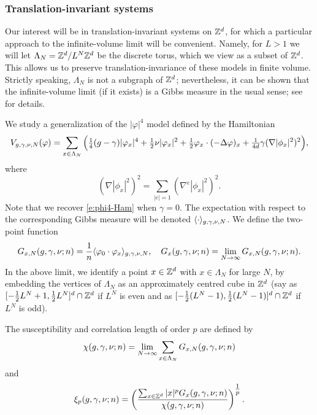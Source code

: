 \subsubsection{Translation-invariant systems}

Our interest will be in translation-invariant systems on ${ {{\mathbb Z}}^d }$, for which a particular approach to the infinite-volume limit will be convenient. Namely, for $L > 1$ we will let $\Lambda_N = { {{\mathbb Z}}^d }/L^N{ {{\mathbb Z}}^d }$ be the discrete torus, which we view as a subset of ${ {{\mathbb Z}}^d }$. This allows us to preserve
translation-invariance of these models in finite volume. Strictly speaking, $\Lambda_N$ is not a subgraph of ${ {{\mathbb Z}}^d }$; nevertheless, it can be shown that the infinite-volume limit (if it exists) is a Gibbs measure in the usual sense; see \cite[Example 4.20]{Georgii11} for details.


We study a generalization of the $|\varphi|^4$ model defined by the Hamiltonian
\begin{equation}
\label{e:Vdef1}
V_{g,\gamma,\nu,N}(\varphi)
	=
\sum_{x\in\Lambda_N}
\Big(
	\tfrac{1}{4} (g - \gamma) |\varphi_x|^4
		+
	\tfrac{1}{2} \nu |\varphi_x|^2
		+
	\tfrac{1}{2} \varphi_x \cdot (-\Delta \varphi)_x
		+
	\tfrac{1}{4 d} \gamma (\nabla |\phi_x|^2)^2
\Big),
\end{equation}
where
\begin{equation}
(\nabla |\phi_x|^2)^2
	=
\sum_{|e|=1} (\nabla^e |\phi_x|^2)^2.
\end{equation}
Note that we recover \eqref{e:phi4-Ham} when $\gamma = 0$.
The expectation with respect to the corresponding Gibbs measure will
be denoted $\langle\cdot\rangle_{g,\gamma,\nu,N}$.
We define the two-point function
\begin{equation}
\label{e:two-point-function-phi4}
G_{x, N}(g,\gamma,\nu; n)
	=
\frac{1}{n} \langle \varphi_0 \cdot \varphi_x \rangle_{g,\gamma,\nu,N},
	\quad
G_x(g,\gamma,\nu; n)
	=
\lim_{N \rightarrow \infty} G_{x, N}(g,\gamma,\nu; n).
\end{equation}
In the above limit, we identify a point $x \in { {{\mathbb Z}}^d }$ with $x \in \Lambda_N$
for large $N$, by embedding the vertices of $\Lambda_N$ as an approximately
centred cube in ${\mathbb Z}^d$ (say as $[-\frac12 L^N+1,\frac12 L^N]^d \cap {\mathbb Z}^d$ if $L^N$ is even
and as $[-\frac12 (L^N-1), \frac12 (L^N-1)]^d \cap {\mathbb Z}^d$ if $L^N$ is odd).

The susceptibility and correlation length of order $p$ are defined by
\begin{equation}
\label{e:susceptibility-def}
\chi(g, \gamma, \nu; n)
	=
\lim_{N\rightarrow\infty} \sum_{x\in\Lambda_N} G_{x,N}(g, \gamma, \nu; n)
\end{equation}
and
\begin{equation}
\xi_p(g, \gamma, \nu; n)
	=
\left(
\frac{\sum_{x\in{ {{\mathbb Z}}^d }} |x|^p G_x(g, \gamma, \nu; n)}{\chi(g, \gamma, \nu; n)}
\right)^{\tfrac{1}{p}}.
\end{equation}

